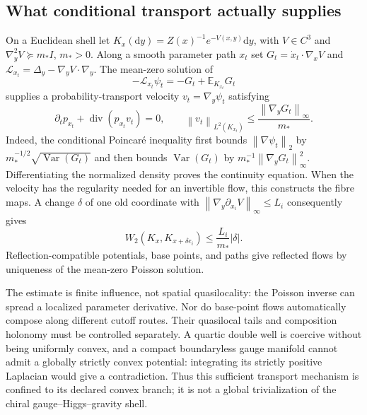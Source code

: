 \documentclass[11pt,a4paper,oneside]{book}
\theoremstyle{plain}
\theoremstyle{definition}
\theoremstyle{remark}
\newcommand{\E}{\mathbb E}
\newcommand{\dd}{\mathrm d}
\newcommand{\Var}{\operatorname{Var}}
\newcommand{\norm}[1]{\left\lVert#1\right\rVert}
\newcommand{\src}[2]{\cite{#1}}
\begin{document}
\subsection{What conditional transport actually supplies}
On a Euclidean shell let
$K_x(\dd y)=Z(x)^{-1}e^{-V(x,y)}\dd y$, with $V\in C^3$ and
$\nabla_y^2V\succeq m_*I$, $m_*>0$.  Along a smooth parameter path $x_t$
set $G_t=\dot x_t\cdot\nabla_xV$ and
$\mathcal L_{x_t}=\Delta_y-\nabla_yV\cdot\nabla_y$.  The mean-zero solution
of
\begin{equation}
 -\mathcal L_{x_t}\psi_t=-G_t+\E_{K_{x_t}}G_t
 \label{eq:conditional-poisson-transport}
\end{equation}
supplies a probability-transport velocity $v_t=\nabla_y\psi_t$ satisfying
\begin{equation}
 \partial_t p_{x_t}+\operatorname{div}(p_{x_t}v_t)=0,
 \qquad
 \norm{v_t}_{L^2(K_{x_t})}\le
        \frac{\norm{\nabla_yG_t}_\infty}{m_*}.
 \label{eq:conditional-transport-energy}
\end{equation}
Indeed, the conditional Poincar\'e inequality first bounds
$\norm{\nabla\psi_t}_2$ by $m_*^{-1/2}\sqrt{\Var(G_t)}$ and then bounds
$\Var(G_t)$ by $m_*^{-1}\norm{\nabla_yG_t}_\infty^2$.
Differentiating the normalized density proves the continuity equation.
When the velocity has the regularity needed for an invertible flow, this
constructs the fibre maps.  A change $\delta$ of one old coordinate with
$\norm{\nabla_y\partial_{x_i}V}_\infty\le L_i$ consequently gives
\[
 W_2(K_x,K_{x+\delta e_i})\le\frac{L_i}{m_*}|\delta|.
\]
Reflection-compatible potentials, base points, and paths give reflected
flows by uniqueness of the mean-zero Poisson solution.
\src{R14}{thm:v14v98-moser,cor:v14v98-influence,cor:v14v98-reflection}

The estimate is finite influence, not spatial quasilocality: the Poisson
inverse can spread a localized parameter derivative.  Nor do base-point
flows automatically compose along different cutoff routes.  Their
quasilocal tails and composition holonomy must be controlled separately.
A quartic double well is coercive without being uniformly convex, and a
compact boundaryless gauge manifold cannot admit a globally strictly
convex potential: integrating its strictly positive Laplacian would give
a contradiction.  Thus this sufficient transport mechanism is confined
to its declared convex branch; it is not a global trivialization of the
chiral gauge--Higgs--gravity shell.
\src{R14}{prop:v14v98-quartic,prop:v14v98-compact}
\end{document}
